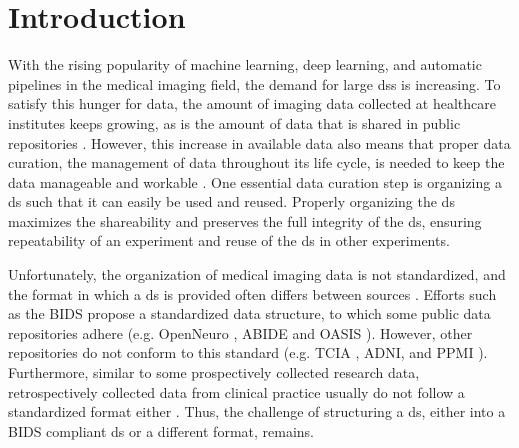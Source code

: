 \section{Introduction}

With the rising popularity of machine learning, deep learning, and automatic pipelines in the medical imaging field, the demand for large \glspl{ds} is increasing.
To satisfy this hunger for data, the amount of imaging data collected at healthcare institutes keeps growing, as is the amount of data that is shared in public repositories \autocite{greenspan2016deep, lundervold2019overview}.
However, this increase in available data also means that proper data curation, the management of data throughout its life cycle, is needed to keep the data manageable and workable \autocite{prevedello2019challenges, vanooijen2019quality}.
One essential data curation step is organizing a \gls{ds} such that it can easily be used and reused.
Properly organizing the \gls{ds} maximizes the shareability and preserves the full integrity of the \gls{ds}, ensuring repeatability of an experiment and reuse of the \gls{ds} in other experiments.

Unfortunately, the organization of medical imaging data is not standardized, and the format in which a \gls{ds} is provided often differs between sources \autocite{lambin2017radiomics, vanooijen2019quality}.
Efforts such as the \gls{BIDS} \autocite{gorgolewski2016brain} propose a standardized data structure, to which some public data repositories adhere (e.g. OpenNeuro \autocite{gorgolewski2017openneuro}, \gls{ABIDE} \autocite{dimartino2017enhancing} and \gls{OASIS} \autocite{lamontagne2018oasis}).
However, other repositories do not conform to this standard (e.g. \gls{TCIA} \autocite{clark2013cancer}, \gls{ADNI}, and \gls{PPMI} \autocite{marek2018parkinson}).
Furthermore, similar to some prospectively collected research data, retrospectively collected data from clinical practice usually do not follow a standardized format either \autocite{vanooijen2019quality}.
Thus, the challenge of structuring a \gls{ds}, either into a \gls{BIDS} compliant \gls{ds} or a different format, remains.

